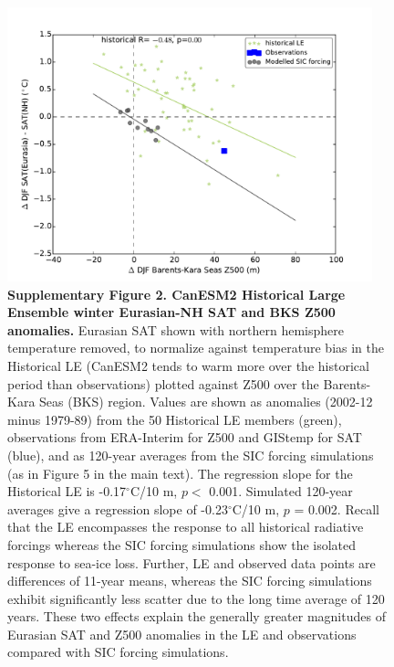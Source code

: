 \documentclass{nature}
\begin{document}
\begin{figure}%
\centering
\noindent\includegraphics[width=25pc]{SuppFigure2_nhremoved_simsadded.pdf}
\caption{\textbf{Supplementary Figure 2. CanESM2 Historical Large Ensemble winter Eurasian-NH SAT and BKS Z500 anomalies.} Eurasian SAT shown with northern hemisphere temperature removed, to normalize against temperature bias in the Historical LE (CanESM2 tends to warm more over the historical period than observations) plotted against Z500 over the Barents-Kara Seas (BKS) region. Values are shown as anomalies (2002-12 minus 1979-89) from the 50 Historical LE members (green), observations from ERA-Interim for Z500 and GIStemp for SAT (blue), and as 120-year averages from the SIC forcing simulations (as in Figure 5 in the main text). The regression slope for the Historical LE is -0.17$^\circ$C/10 m, $p <$ 0.001. Simulated 120-year averages give a regression slope of -0.23$^\circ$C/10 m, $p$ = 0.002. Recall that the LE encompasses the response to all historical radiative forcings whereas the SIC forcing simulations show the isolated response to sea-ice loss. Further, LE and observed data points are differences of 11-year means, whereas the SIC forcing simulations exhibit significantly less scatter due to the long time average of 120 years. These two effects explain the generally greater magnitudes of Eurasian SAT and Z500 anomalies in the LE and observations compared with SIC forcing simulations.
}
\label{fig:supp2b} 
\end{figure}
\end{document}
